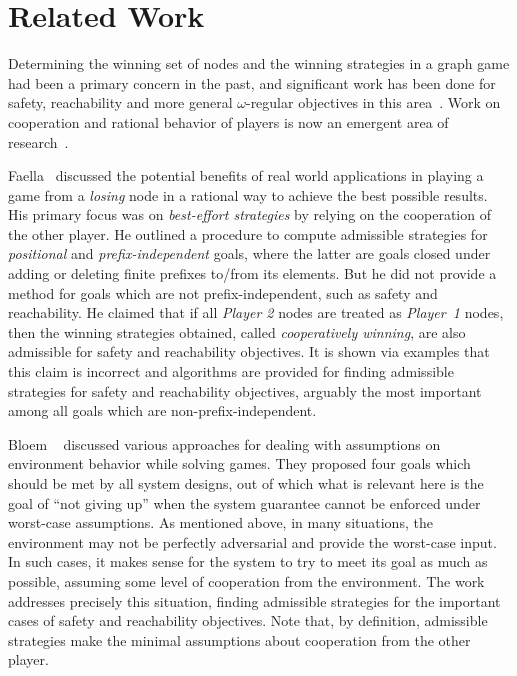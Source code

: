 \chapter{Related Work}
\label{Sec:RelatedWork}
Determining the winning set of nodes and the winning strategies in a
graph game had been a primary concern in the past, and significant
work has been done for safety, reachability and more general
$\omega$-regular objectives in this
area~\cite{AutomataLogicsInfiniteGames}. Work on cooperation and
rational behavior of players is now an emergent area of
research~\cite{AssumptionSynthesis,PerimeterOfWorldModel,CompositionalSynthesis,AdmissibleInfiniteGames,RationalSynthesis}.

Faella~\cite{AdmissibleInfiniteGames} discussed the potential benefits
of real world applications in playing a game from a \textit{losing}
node in a rational way to achieve the best possible results. His
primary focus was on \textit{best-effort strategies} by relying on the
cooperation of the other player. He outlined a procedure to compute
admissible strategies for \emph{positional} and
\textit{prefix-independent} goals, where the latter are goals closed
under adding or deleting finite prefixes to/from its elements. But he
did not provide a method for goals which are not prefix-independent,
such as safety and reachability. He claimed that if all \textit{Player
	2} nodes are treated as \textit{Player~1} nodes, then the winning
strategies obtained, called \emph{cooperatively winning}, are also
admissible for safety and reachability objectives. It is shown via
examples that this claim is incorrect and algorithms are provided for
finding admissible strategies for safety and reachability objectives,
arguably the most important among all goals which are
non-prefix-independent.

Bloem \etal~\cite{AssumptionSynthesis} discussed various approaches
for dealing with assumptions on environment behavior while solving
games. They proposed four goals which should be met by all system
designs, out of which what is relevant here is the goal of ``not
giving up'' when the system guarantee cannot be enforced under
worst-case assumptions. As mentioned above, in many situations, the
environment may not be perfectly adversarial and provide the
worst-case input. In such cases, it makes sense for the system to try
to meet its goal as much as possible, assuming some level of
cooperation from the environment. The work addresses precisely this
situation, finding admissible strategies for the important cases of
safety and reachability objectives. Note that, by definition,
admissible strategies make the minimal assumptions about cooperation
from the other player.

